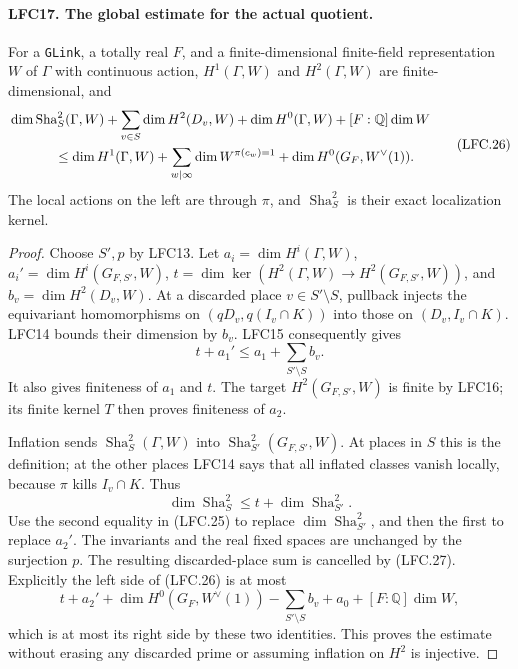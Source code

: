 \documentclass[11pt,a4paper]{article}
\numberwithin{equation}{section}
\theoremstyle{remark}\newtheorem{remark}[theorem]{Remark}
\begin{document}
\paragraph{LFC17. The global estimate for the actual quotient.}
\label{claim:LFC17}
For a \texttt{GLink}, a totally real \(F\), and a
finite-dimensional finite-field representation \(W\)
of \(\Gamma\) with continuous action, \(H^1(\Gamma,W)\)
and \(H^2(\Gamma,W)\) are finite-dimensional, and
\[
 \begin{split}
 &\dim\operatorname{Sha}^2_S(\Gamma,W)+
       \sum_{v\in S}\dim H^2(D_v,W)+\dim H^0(\Gamma,W)
                          +[F:\mathbb Q]\dim W\\
 &\hspace{12mm}\le
       \dim H^1(\Gamma,W)+
       \sum_{w\mid\infty}\dim W^{\pi(c_w)=1}
       +\dim H^0(G_F,W^\vee(1)).
 \end{split}                                           \tag{LFC.26}
\]
The local actions on the left are through \(\pi\), and
\(\operatorname{Sha}^2_S\) is their exact localization kernel.

\begin{proof}
Choose \(S',p\) by LFC13.
Let \(a_i=\dim H^i(\Gamma,W)\),
\(a_i'=\dim H^i(G_{F,S'},W)\),
\(t=\dim\ker(H^2(\Gamma,W)\to H^2(G_{F,S'},W))\),
and \(b_v=\dim H^2(D_v,W)\).
At a discarded place \(v\in S'\setminus S\), pullback
injects the equivariant homomorphisms on
\((qD_v,q(I_v\cap K))\) into those on \((D_v,I_v\cap K)\).
LFC14 bounds their dimension by \(b_v\).
LFC15 consequently gives
\[
                     t+a_1'\le a_1+\sum_{S'\setminus S}b_v.
                                                        \tag{LFC.27}
\]
It also gives finiteness of \(a_1\) and \(t\).
The target \(H^2(G_{F,S'},W)\) is finite by LFC16;
its finite kernel \(T\) then proves finiteness of \(a_2\).

Inflation sends \(\operatorname{Sha}^2_S(\Gamma,W)\) into
\(\operatorname{Sha}^2_{S'}(G_{F,S'},W)\).
At places in \(S\) this is the definition; at the other
places LFC14 says that all inflated classes vanish
locally, because \(\pi\) kills \(I_v\cap K\).
Thus
\[
             \dim\operatorname{Sha}^2_S\le t+\dim\operatorname{Sha}^2_{S'}.
 \]
Use the second equality in (LFC.25) to replace
\(\dim\operatorname{Sha}^2_{S'}\), and then the first to replace
\(a_2'\).  The invariants and the real fixed spaces
are unchanged by the surjection \(p\).
The resulting discarded-place sum is cancelled by
(LFC.27).  Explicitly the left side of (LFC.26) is at most
\[
 t+a_2'+\dim H^0(G_F,W^\vee(1))
     -\sum_{S'\setminus S}b_v+a_0+[F:\mathbb Q]\dim W,
 \]
which is at most its right side by these two identities.
This proves the estimate without erasing any discarded
prime or assuming inflation on \(H^2\) is injective.
\end{proof}
\end{document}
